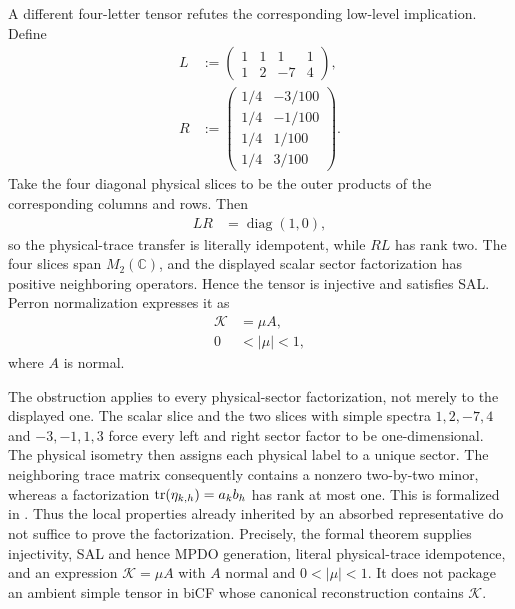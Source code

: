 \documentclass{article}
\begin{document}
A different four-letter tensor refutes the corresponding low-level
implication. Define
\begin{align}
    L
        &:=
        \begin{pmatrix}
            1&1&1&1\\
            1&2&-7&4
        \end{pmatrix},
    \label{eq:cpgsv17_noncartesian_left_matrix}\\
    R
        &:=
        \begin{pmatrix}
            1/4&-3/100\\
            1/4&-1/100\\
            1/4&1/100\\
            1/4&3/100
        \end{pmatrix}.
    \label{eq:cpgsv17_noncartesian_right_matrix}
\end{align}
Take the four diagonal physical slices to be the outer products of the
corresponding columns and rows. Then
\begin{align}
    LR
        &= \operatorname{diag}(1,0),
    \label{eq:cpgsv17_noncartesian_physical_projection}
\end{align}
so the physical-trace transfer is literally idempotent, while $RL$ has rank
two. The four slices span $M_2(\mathbb C)$, and the displayed scalar sector
factorization has positive neighboring operators. Hence the tensor is
injective and satisfies SAL. Perron normalization expresses it as
\begin{align}
    \mathcal K
        &= \mu A,
    \label{eq:cpgsv17_noncartesian_perron_normalization}\\
    0
        &< |\mu|
         < 1,
    \label{eq:cpgsv17_noncartesian_subunit_weight}
\end{align}
where $A$ is normal.

The obstruction applies to every physical-sector factorization, not merely to
the displayed one. The scalar slice and the two slices with simple spectra
$1,2,-7,4$ and $-3,-1,1,3$ force every left and right sector factor to be
one-dimensional. The physical isometry then assigns each physical label to a
unique sector. The neighboring trace matrix consequently contains a nonzero
two-by-two minor, whereas a factorization
$\operatorname{tr}(\eta_{k,h})=a_kb_h$ has rank at most one. This is formalized in
. Thus the local properties already inherited by
an absorbed representative do not suffice to prove the factorization.
Precisely, the formal theorem supplies injectivity, SAL and hence MPDO
generation, literal physical-trace idempotence, and an expression
$\mathcal K=\mu A$ with $A$ normal and $0<|\mu|<1$. It does not package an
ambient simple tensor in biCF whose canonical reconstruction contains
$\mathcal K$.
\end{document}
